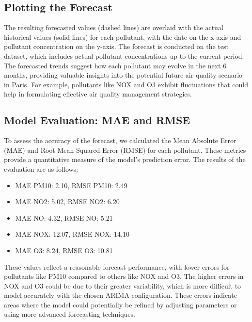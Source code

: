\documentclass{modeleRapport}
\begin{document}
\newpage
\subsection{Plotting the Forecast}
The resulting forecasted values (dashed lines) are overlaid with the actual historical values (solid lines) for each pollutant, 
with the date on the x-axis and pollutant concentration on the y-axis. The forecast is conducted on the test dataset, 
which includes actual pollutant concentrations up to the current period.\\

The forecasted trends suggest how each pollutant may evolve in the next 6 months, providing valuable insights into the 
potential future air quality scenario in Paris. For example, pollutants like NOX and O3 exhibit fluctuations that could help 
in formulating effective air quality management strategies.\\

\subsection{Model Evaluation: MAE and RMSE}

To assess the accuracy of the forecast, we calculated the Mean Absolute Error (MAE) and Root Mean Squared Error (RMSE) 
for each pollutant. These metrics provide a quantitative measure of the model's prediction error. The results of the 
evaluation are as follows:\\

\begin{itemize}
    \item MAE PM10: 2.10, RMSE PM10: 2.49
    \item MAE NO2: 5.02, RMSE NO2: 6.20
    \item MAE NO: 4.32, RMSE NO: 5.21
    \item MAE NOX: 12.07, RMSE NOX: 14.10
    \item MAE O3: 8.24, RMSE O3: 10.81
\end{itemize}

These values reflect a reasonable forecast performance, with lower errors for pollutants like PM10 compared to others 
like NOX and O3. The higher errors in NOX and O3 could be due to their greater variability, which is more difficult to 
model accurately with the chosen ARIMA configuration. These errors indicate areas where the model could potentially be 
refined by adjusting parameters or using more advanced forecasting techniques.\\
\end{document}
